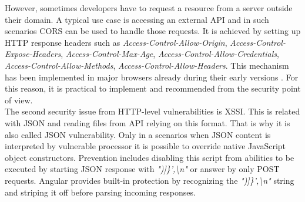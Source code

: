 \documentclass{article} %
\begin{document}
\newline
However, sometimes developers have to request a resource from a server outside their domain. A typical use case is accessing an external API and in such scenarios CORS can be used to handle those requests. It is achieved by setting up HTTP response headers such as \textit{Access-Control-Allow-Origin}, \textit{Access-Control-Expose-Headers}, \textit{Access-Control-Max-Age}, \textit{Access-Control-Allow-Credentials}, \textit{Access-Control-Allow-Methods}, \textit{Access-Control-Allow-Headers}. This mechanism has been implemented in major browsers already during their early versions \cite{bib:caniuse_cors}. For this reason, it is practical to implement and recommended from the security point of view.\\
\newline
The second security issue from HTTP-level vulnerabilities is XSSI. This is related with JSON and reading files from API relying on this format. That is why it is also called JSON vulnerability. Only in a scenarios when JSON content is interpreted by vulnerable processor it is possible to override native JavaScript object constructors. Prevention includes disabling this script from abilities to be executed by starting JSON response with \textit{")]\}',\textbackslash n"} or answer by only POST requests. Angular provides built-in protection by recognizing the \textit{")]\}',\textbackslash n"} string and striping it off before parsing incoming responses.
\end{document}
